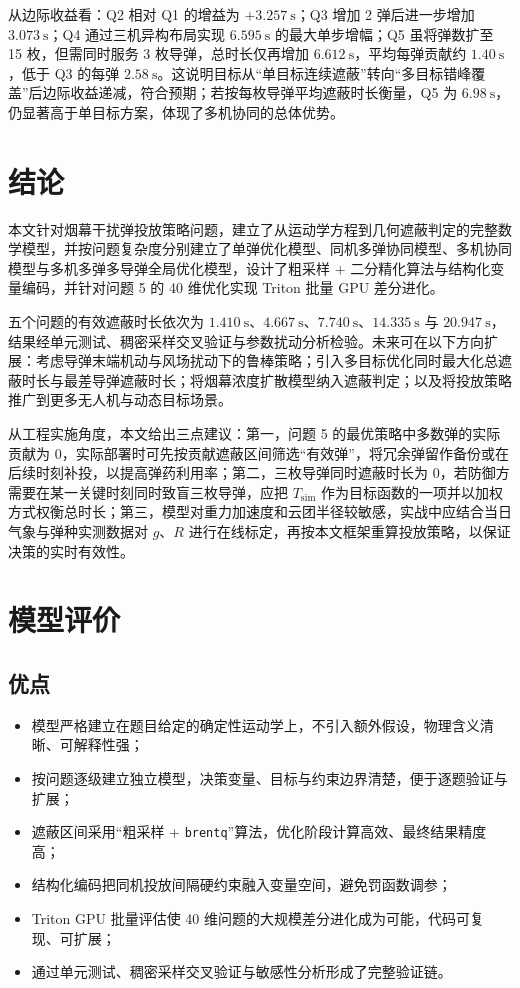 \documentclass[11pt,a4paper]{ctexart}
\begin{document}
从边际收益看：Q2 相对 Q1 的增益为 $+3.257~\mathrm{s}$；Q3 增加 2 弹后进一步增加 $3.073~\mathrm{s}$；Q4 通过三机异构布局实现 $6.595~\mathrm{s}$ 的最大单步增幅；Q5 虽将弹数扩至 15 枚，但需同时服务 3 枚导弹，总时长仅再增加 $6.612~\mathrm{s}$，平均每弹贡献约 $1.40~\mathrm{s}$，低于 Q3 的每弹 $2.58~\mathrm{s}$。这说明目标从“单目标连续遮蔽”转向“多目标错峰覆盖”后边际收益递减，符合预期；若按每枚导弹平均遮蔽时长衡量，Q5 为 $6.98~\mathrm{s}$，仍显著高于单目标方案，体现了多机协同的总体优势。

\section{结论}

本文针对烟幕干扰弹投放策略问题，建立了从运动学方程到几何遮蔽判定的完整数学模型，并按问题复杂度分别建立了单弹优化模型、同机多弹协同模型、多机协同模型与多机多弹多导弹全局优化模型，设计了粗采样 + 二分精化算法与结构化变量编码，并针对问题 5 的 40 维优化实现 Triton 批量 GPU 差分进化。

五个问题的有效遮蔽时长依次为 $1.410~\mathrm{s}$、$4.667~\mathrm{s}$、$7.740~\mathrm{s}$、$14.335~\mathrm{s}$ 与 $20.947~\mathrm{s}$，结果经单元测试、稠密采样交叉验证与参数扰动分析检验。未来可在以下方向扩展：考虑导弹末端机动与风场扰动下的鲁棒策略；引入多目标优化同时最大化总遮蔽时长与最差导弹遮蔽时长；将烟幕浓度扩散模型纳入遮蔽判定；以及将投放策略推广到更多无人机与动态目标场景。

从工程实施角度，本文给出三点建议：第一，问题 5 的最优策略中多数弹的实际贡献为 0，实际部署时可先按贡献遮蔽区间筛选“有效弹”，将冗余弹留作备份或在后续时刻补投，以提高弹药利用率；第二，三枚导弹同时遮蔽时长为 0，若防御方需要在某一关键时刻同时致盲三枚导弹，应把 $T_{\mathrm{sim}}$ 作为目标函数的一项并以加权方式权衡总时长；第三，模型对重力加速度和云团半径较敏感，实战中应结合当日气象与弹种实测数据对 $g$、$R$ 进行在线标定，再按本文框架重算投放策略，以保证决策的实时有效性。

\section{模型评价}

\subsection{优点}
\begin{itemize}
  \item 模型严格建立在题目给定的确定性运动学上，不引入额外假设，物理含义清晰、可解释性强；
  \item 按问题逐级建立独立模型，决策变量、目标与约束边界清楚，便于逐题验证与扩展；
  \item 遮蔽区间采用“粗采样 + \texttt{brentq}”算法，优化阶段计算高效、最终结果精度高；
  \item 结构化编码把同机投放间隔硬约束融入变量空间，避免罚函数调参；
  \item Triton GPU 批量评估使 40 维问题的大规模差分进化成为可能，代码可复现、可扩展；
  \item 通过单元测试、稠密采样交叉验证与敏感性分析形成了完整验证链。
\end{itemize}
\end{document}
